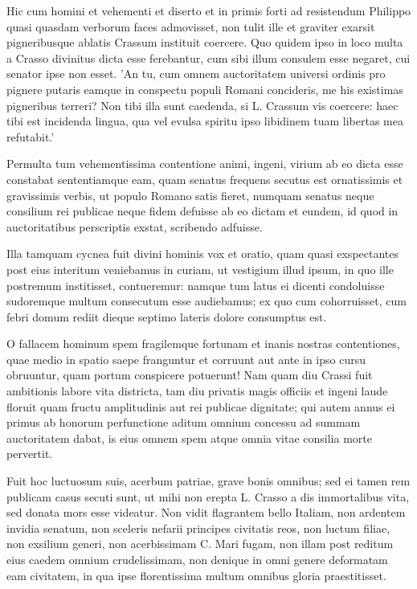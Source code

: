  Hic cum homini et vehementi et diserto et in primis forti ad resistendum Philippo quasi quasdam verborum faces admovisset, non tulit ille et graviter exarsit pigneribusque ablatis Crassum instituit coercere. Quo quidem ipso in loco multa a Crasso divinitus dicta esse ferebantur, cum sibi illum consulem esse negaret, cui senator ipse non esset. 'An tu, cum omnem auctoritatem universi ordinis pro pignere putaris eamque in conspectu populi Romani concideris, me his existimas pigneribus terreri? Non tibi illa sunt caedenda, si L. Crassum vis coercere: haec tibi est incidenda lingua, qua vel evulsa spiritu ipso libidinem tuam libertas mea refutabit.'

 Permulta tum vehementissima contentione animi, ingeni, virium ab eo dicta esse constabat sententiamque eam, quam senatus frequens secutus est ornatissimis et gravissimis verbis, ut populo Romano satis fieret, numquam senatus neque consilium rei publicae neque fidem defuisse ab eo dictam et eundem, id quod in auctoritatibus perscriptis exstat, scribendo adfuisse.

 Illa tamquam cycnea fuit divini hominis vox et oratio, quam quasi exspectantes post eius interitum veniebamus in curiam, ut vestigium illud ipsum, in quo ille postremum institisset, contueremur: namque tum latus ei dicenti condoluisse sudoremque multum consecutum esse audiebamus; ex quo cum cohorruisset, cum febri domum rediit dieque septimo lateris dolore consumptus est.

 O fallacem hominum spem fragilemque fortunam et inanis nostras contentiones, quae medio in spatio saepe franguntur et corruunt aut ante in ipso cursu obruuntur, quam portum conspicere potuerunt! Nam quam diu Crassi fuit ambitionis labore vita districta, tam diu privatis magis officiis et ingeni laude floruit quam fructu amplitudinis aut rei publicae dignitate; qui autem annus ei primus ab honorum perfunctione aditum omnium concessu ad summam auctoritatem dabat, is eius omnem spem atque omnia vitae consilia morte pervertit.

 Fuit hoc luctuosum suis, acerbum patriae, grave bonis omnibus; sed ei tamen rem publicam casus secuti sunt, ut mihi non erepta L. Crasso a dis immortalibus vita, sed donata mors esse videatur. Non vidit flagrantem bello Italiam, non ardentem invidia senatum, non sceleris nefarii principes civitatis reos, non luctum filiae, non exsilium generi, non acerbissimam C. Mari fugam, non illam post reditum eius caedem omnium crudelissimam, non denique in omni genere deformatam eam civitatem, in qua ipse florentissima multum omnibus gloria praestitisset.

